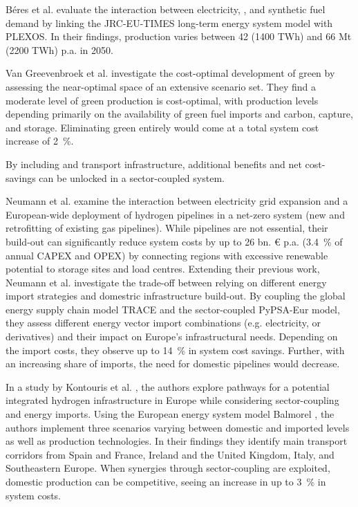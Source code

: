 \documentclass[preprint,12pt,sort&compress]{elsarticle}
\begin{document}
Béres et al. \cite{beresWillHydrogenSynthetic2024} evaluate the interaction between electricity, , and synthetic fuel demand by linking the JRC-EU-TIMES long-term energy system model with PLEXOS. In their findings,  production varies between 42 (1400 TWh) and 66 Mt (2200 TWh) p.a. in 2050. 

Van Greevenbroek et al. \cite{greevenbroekLittleLoseCase2024} investigate the cost-optimal development of green  by assessing the near-optimal space of an extensive scenario set. They find a moderate level of green  production is cost-optimal, with production levels depending primarily on the availability of green fuel imports and carbon, capture, and storage. Eliminating green  entirely would come at a total system cost increase of \SI{2}{\percent}. 

By including  and  transport infrastructure, additional benefits and net cost-savings can be unlocked in a sector-coupled system.

Neumann et al. \cite{neumannPotentialRoleHydrogen2023} examine the interaction between electricity grid expansion and a European-wide deployment of hydrogen pipelines in a net-zero system (new and retrofitting of existing gas pipelines). While  pipelines are not essential, their build-out can significantly reduce system costs by up to 26 bn. \euro{} p.a. (\SI{3.4}{\percent} of annual CAPEX and OPEX) by connecting regions with excessive renewable potential to storage sites and load centres. 
Extending their previous work, Neumann et al. \cite{neumannEnergyImportsInfrastructure2024} investigate the trade-off between relying on different energy import strategies and domestric infrastructure build-out. By coupling the global energy supply chain model TRACE \cite{hamppImportOptionsChemical2023} and the sector-coupled PyPSA-Eur model, they assess different energy vector import combinations (e.g. electricity,  or  derivatives) and their impact on Europe's infrastructural needs. Depending on the import costs, they observe up to \SI{14}{\percent} in system cost savings. Further, with an increasing share of  imports, the need for domestic  pipelines would decrease. 

In a study by Kontouris et al. \cite{kountourisUnifiedEuropeanHydrogen2024}, the authors explore pathways for a potential integrated hydrogen infrastructure in Europe while considering sector-coupling and energy imports. Using the European energy system model Balmorel \cite{wieseBalmorelOpenSource2018}, the authors implement three scenarios varying between domestic and imported  levels as well as  production technologies. In their findings they identify main  transport corridors from Spain and France, Ireland and the United Kingdom, Italy, and Southeastern Europe. When synergies through sector-coupling are exploited, domestic  production can be competitive, seeing an increase in up to \SI{3}{\percent} in system costs.
\end{document}
